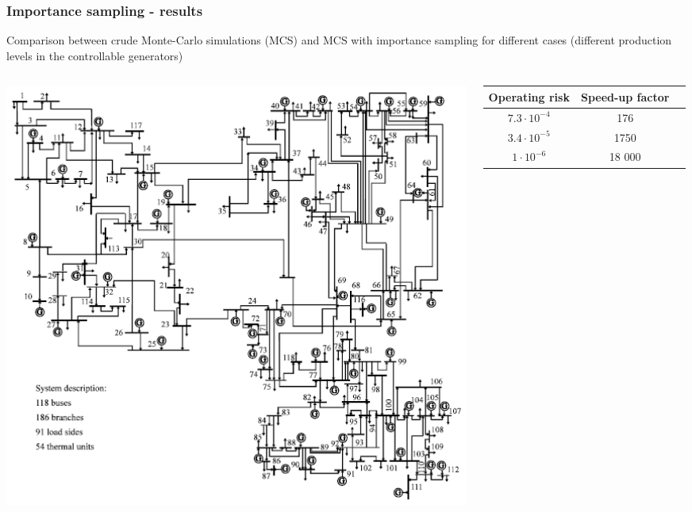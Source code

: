 \documentclass{beamer}
\begin{document}
\begin{frame}
  \frametitle{Importance sampling - results}
\begin{block}{}
Comparison between crude Monte-Carlo simulations (MCS) and MCS with importance sampling for different cases (different production levels in the controllable generators)    
\end{block}
\begin{columns}
  \begin{column}{0.5\textwidth}
    \includegraphics[width=1\textwidth]{Figs/ieee118.png}
  \end{column}
  \begin{column}{0.5\textwidth}
  \begin{tabular}{ccc}
\toprule
Operating risk & Speed-up factor \\
\midrule
$7.3 \cdot 10^{-4}$ & 176 \\
$3.4 \cdot 10^{-5}$ & 1750 \\
$1 \cdot 10^{-6}$ & 18 000\\
\bottomrule    
  \end{tabular}   
  \end{column}
\end{columns}
\end{frame}
\end{document}
